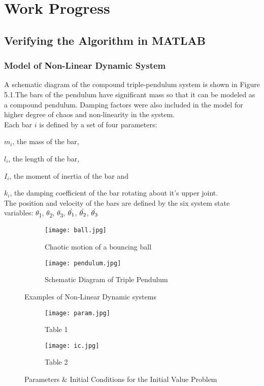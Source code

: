 \chapter{Work Progress}
\label{chap:work}
\setlength{\parskip}{1.5mm}
\section{Verifying the Algorithm in MATLAB}
\subsection{Model of Non-Linear Dynamic System}
A schematic diagram of the compound triple-pendulum system is shown in Figure 5.1.The bars of the pendulum have significant mass so that it can be modeled as a compound pendulum. Damping factors were also included in the model for higher degree of chaos and non-linearity in the system.\\ 
Each bar ${i}$ is defined by a set of four parameters: 

${m_{i}}$, the mass of the bar,

${l_{i}}$, the length of the bar,

${I_{i}}$, the moment of inertia of the bar and

${k_{i}}$, the damping coefficient of the bar rotating about it's upper joint.\\                                                                              
The position and velocity of the bars are defined by the six system state variables: $\theta$\textsubscript{1}, $\theta$\textsubscript{2}, $\theta$\textsubscript{3}, ${\dot{\theta\textsubscript{1}}}$, ${\dot{\theta\textsubscript{2}}}$, ${\dot{\theta\textsubscript{3}}}$


\begin{figure}[H]
\begin{subfigure}{0.5\textwidth}
\texttt{[image: ball.jpg]}
\caption{Chaotic motion of a bouncing ball}\label{fig:ball}
\end{subfigure}
\begin{subfigure}{0.5\textwidth}
\texttt{[image: pendulum.jpg]}
\caption{Schematic Diagram of Triple Pendulum}\label{fig:pendulum}
\end{subfigure}
\caption{Examples of Non-Linear Dynamic systems}\label{fig:image1}

\end{figure}
\begin{figure}[h]
\begin{subfigure}{0.5\textwidth}
\texttt{[image: param.jpg]}
\caption{Table 1}\label{fig:param}
\end{subfigure}
\begin{subfigure}{0.5\textwidth}
\texttt{[image: ic.jpg]}
\caption{Table 2}\label{fig:ic}
\end{subfigure}
\caption{Parameters \& Initial Conditions for the Initial Value Problem}\label{fig:image2}
\end{figure}


